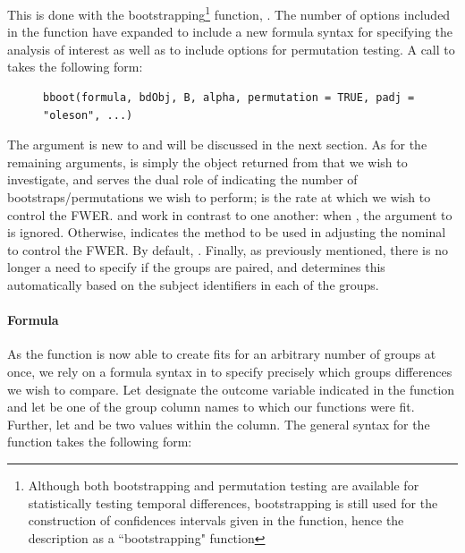 This is done with the bootstrapping\footnote{Although both bootstrapping and permutation testing are available for statistically testing temporal differences, bootstrapping is still used for the construction of confidences intervals given in the  function, hence the description as a ``bootstrapping" function} function, . The number of options included in the  function have expanded to include a new formula syntax for specifying the analysis of interest as well as to include options for permutation testing. A call to  takes the following form:

\begin{singlespace}
\begin{figure}[H]
\centering
\begin{BVerbatim}
bboot(formula, bdObj, B, alpha, permutation = TRUE, padj = "oleson", ...)
\end{BVerbatim}

\end{figure}
\end{singlespace}

The  argument is new to   and will be discussed in the next section. As for the remaining arguments,  is simply the object returned from  that we wish to investigate, and  serves the dual role of indicating the number of bootstraps/permutations we wish to perform;  is the rate at which we wish to control the FWER.  and  work in contrast to one another: when , the argument to  is ignored. Otherwise,  indicates the method to be used in adjusting the nominal  to control the FWER. By default, . Finally, as previously mentioned, there is no longer a need to specify if the groups are paired, and  determines this automatically based on the subject identifiers in each of the groups.


\paragraph{Formula} \label{sec:formula}

As the  function is now able to create fits for an arbitrary number of groups at once, we rely on a formula syntax in  to specify precisely which groups differences we wish to compare. Let  designate the outcome variable indicated in the  function and let  be one of the group column names to which our functions were fit. Further, let  and  be two values within the  column. The general syntax for the  function takes the following form:


